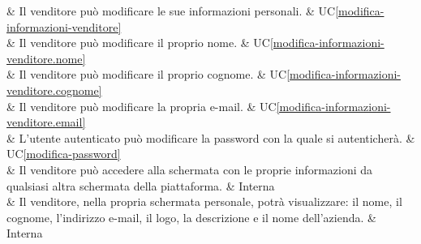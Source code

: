  & Il venditore può modificare le sue informazioni personali. & UC\ref{modifica-informazioni-venditore} \\
	
 & Il venditore può modificare il proprio nome. & UC\ref{modifica-informazioni-venditore.nome} \\
	
 & Il venditore può modificare il proprio cognome. & UC\ref{modifica-informazioni-venditore.cognome} \\
	
 & Il venditore può modificare la propria e-mail. & UC\ref{modifica-informazioni-venditore.email} \\

 & L'utente autenticato può modificare la password con la quale si autenticherà. & UC\ref{modifica-password} \\

 & Il venditore può accedere alla schermata con le proprie informazioni da qualsiasi altra schermata della piattaforma. & Interna \\
	
 & Il venditore, nella propria schermata personale, potrà visualizzare: il nome, il cognome, l'indirizzo e-mail, il logo, la descrizione e il nome dell'azienda. & Interna \\ 